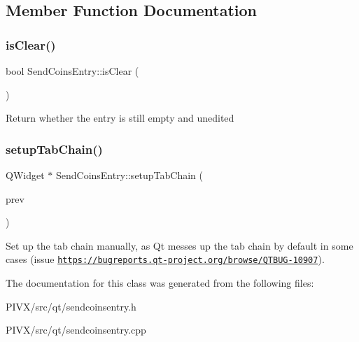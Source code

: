 \subsection{Member Function Documentation}
\mbox{\label{class_send_coins_entry_a1dcce9480364868dfd0bb8782e039e57}} 
\subsubsection{\texorpdfstring{is\+Clear()}{isClear()}}
{\footnotesize\ttfamily bool Send\+Coins\+Entry\+::is\+Clear (\begin{DoxyParamCaption}{ }\end{DoxyParamCaption})}

Return whether the entry is still empty and unedited \mbox{\label{class_send_coins_entry_aa431a0bf53174b3a012fe224e472bc13}} 
\subsubsection{\texorpdfstring{setup\+Tab\+Chain()}{setupTabChain()}}
{\footnotesize\ttfamily Q\+Widget $\ast$ Send\+Coins\+Entry\+::setup\+Tab\+Chain (\begin{DoxyParamCaption}\item[{Q\+Widget $\ast$}]{prev }\end{DoxyParamCaption})}

Set up the tab chain manually, as Qt messes up the tab chain by default in some cases (issue \href{https://bugreports.qt-project.org/browse/QTBUG-10907}{\tt https\+://bugreports.\+qt-\/project.\+org/browse/\+Q\+T\+B\+U\+G-\/10907}). 

The documentation for this class was generated from the following files\+:\begin{DoxyCompactItemize}
\item 
P\+I\+V\+X/src/qt/sendcoinsentry.\+h\item 
P\+I\+V\+X/src/qt/sendcoinsentry.\+cpp\end{DoxyCompactItemize}
